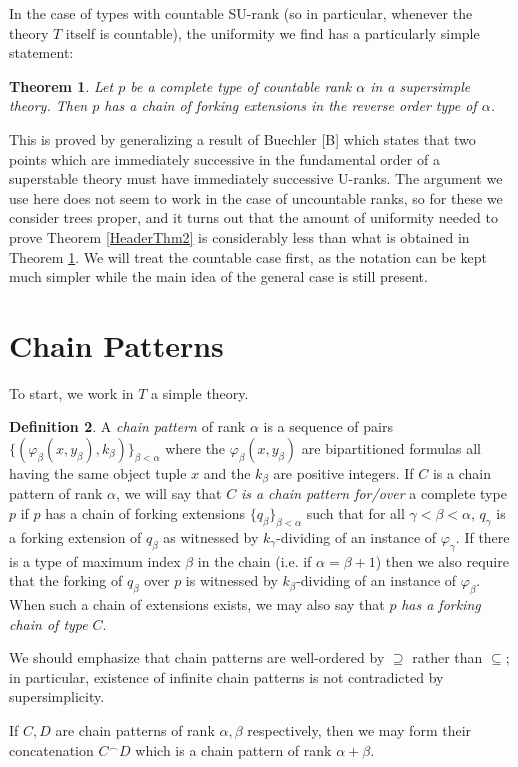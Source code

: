 \documentclass{article}
\newtheorem{theorem}{Theorem}[section]
\theoremstyle{remark}
\theoremstyle{definition}
\newtheorem{definition}[theorem]{Definition}
\begin{document}
In the case of types with countable SU-rank (so in particular, whenever the theory $T$ itself is countable), the uniformity we find has a particularly simple statement:

\begin{theorem}\label{HeaderThm3}
    Let $p$ be a complete type of countable rank $\alpha$ in a supersimple theory. Then $p$ has a chain of forking extensions in the reverse order type of $\alpha$.
\end{theorem}

This is proved by generalizing a result of Buechler [B] which states that two points which are immediately successive in the fundamental order of a superstable theory must have immediately successive U-ranks. The argument we use here does not seem to work in the case of uncountable ranks, so for these we consider trees proper, and it turns out that the amount of uniformity needed to prove Theorem \ref{HeaderThm2} is considerably less than what is obtained in Theorem \ref{HeaderThm3}. We will treat the countable case first, as the notation can be kept much simpler while the main idea of the general case is still present.



\section{Chain Patterns}
To start, we work in $T$ a simple theory.
\begin{definition}
    A \textit{chain pattern} of rank $\alpha$ is a sequence of pairs $\{(\varphi_\beta(x,y_
    \beta),k_\beta)\}_{\beta<\alpha}$ where the $\varphi_\beta(x,y_\beta)$ are bipartitioned formulas all having the same object tuple $x$ and the $k_\beta$ are positive integers. If $C$ is a chain pattern of rank $\alpha$, we will say that $C$ \textit{is a chain pattern for/over} a complete type $p$ if $p$ has a chain of forking extensions $\{q_\beta\}_{\beta<\alpha}$ such that for all $\gamma<\beta<\alpha$, $q_\gamma$ is a forking extension of $q_\beta$ as witnessed by $k_\gamma$-dividing of an instance of $\varphi_\gamma$. If there is a type of maximum index $\beta$ in the chain (i.e. if $\alpha=\beta+1$) then we also require that the forking of $q_\beta$ over $p$ is witnessed by $k_\beta$-dividing of an instance of $\varphi_\beta$. When such a chain of extensions exists, we may also say that $p$ \textit{has a forking chain of type} $C$.
    
    We should emphasize that chain patterns are well-ordered by $\supseteq$ rather than $\subseteq$; in particular, existence of infinite chain patterns is not contradicted by supersimplicity.
\end{definition}
If $C,D$ are chain patterns of rank $\alpha,\beta$ respectively, then we may form their concatenation $C^\frown D$ which is a chain pattern of rank $\alpha+\beta$.
\end{document}
